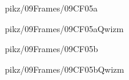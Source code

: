 \documentclass[9pt,xcolor={svgnames, x11names}]{beamer}
\begin{document}

\begin{frame}{pikz/09Frames/09CF05a}
  
\end{frame}


\begin{frame}{pikz/09Frames/09CF05aQwizm}
  
\end{frame}


\begin{frame}{pikz/09Frames/09CF05b}
  
\end{frame}


\begin{frame}{pikz/09Frames/09CF05bQwizm}
  
\end{frame}

\end{document}
